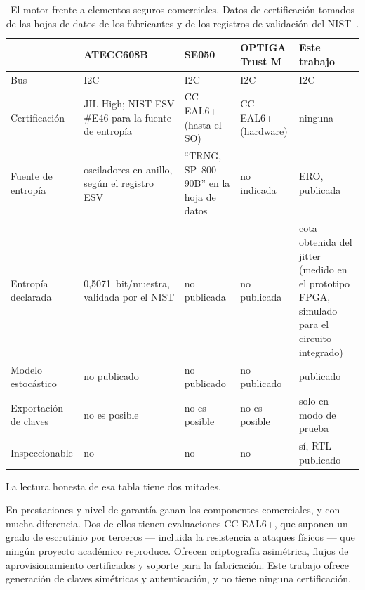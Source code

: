 \begin{table}[htbp]
\centering
\caption{El motor frente a elementos seguros comerciales. Datos de
certificación tomados de las hojas de datos de los fabricantes y de los
registros de validación del NIST~\cite{microchip_atecc608b_ds, nist_esv_e46, nxp_se050_ds,
infineon_optiga_trustm_ds}.}
\label{tab:se}
\small
\begin{tabular}{@{}lp{2.6cm}p{2.4cm}p{2.2cm}p{2.6cm}@{}}
\toprule
 & ATECC608B & SE050 & OPTIGA Trust M & Este trabajo \\
\midrule
Bus            & \ac{I2C} & \ac{I2C} & \ac{I2C} & \ac{I2C} \\
Certificación  & JIL High; NIST ESV \#E46 para la fuente de entropía & CC EAL6+ (hasta el SO) & CC EAL6+ (hardware) & ninguna \\
Fuente de entropía & osciladores en anillo, según el registro ESV & ``TRNG, SP~800-90B'' en la hoja de datos & no indicada & \ac{ERO}, publicada \\
Entropía declarada & 0,5071~bit/muestra, validada por el NIST & no publicada & no publicada & cota obtenida del jitter (medido en el prototipo \ac{FPGA}, simulado para el circuito integrado) \\
Modelo estocástico & no publicado & no publicado & no publicado & publicado \\
Exportación de claves & no es posible & no es posible & no es posible & solo en modo de prueba \\
Inspeccionable & no & no & no & sí, \ac{RTL} publicado \\
\bottomrule
\end{tabular}
\end{table}

La lectura honesta de esa tabla tiene dos mitades.

En prestaciones y nivel de garantía ganan los componentes comerciales, y
con mucha diferencia. Dos de ellos tienen evaluaciones CC EAL6+, que
suponen un grado de escrutinio por terceros --- incluida la resistencia a
ataques físicos --- que ningún proyecto académico reproduce. Ofrecen
criptografía asimétrica, flujos de aprovisionamiento certificados y
soporte para la fabricación. Este trabajo ofrece generación de claves
simétricas y autenticación, y no tiene ninguna certificación.


